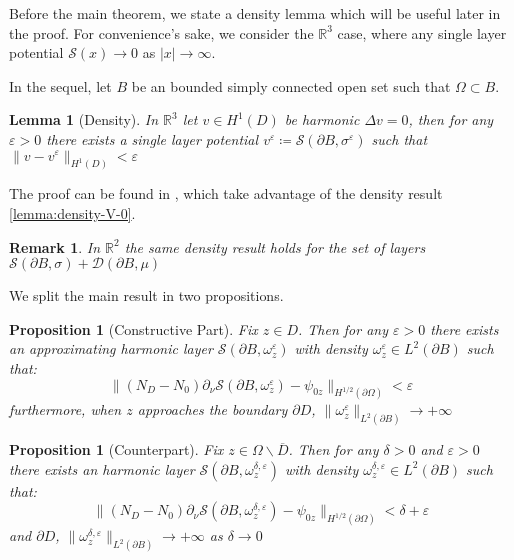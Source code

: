 \documentclass[10pt, a4paper, twoside, openright]{book}
\theoremstyle{definition}
\theoremstyle{plain}
\theoremstyle{plain}
\theoremstyle{plain}
\newtheorem{proposition}[subsection]{Proposition}
\theoremstyle{plain}
\newtheorem{remark}[subsection]{Remark}
\theoremstyle{plain}
\newtheorem{lemma}[subsection]{Lemma}
\theoremstyle{plain}
\theoremstyle{plain}
\theoremstyle{plain}
\let\epsilon\varepsilon
\begin{document}
 Before the main theorem, we state a density lemma which will be useful later in the proof. For convenience's sake, we consider the $\mathbb{R}^3$ case, 
 where any single layer potential $\mathcal{S}(x)\to0$ as $|x|\to \infty$.
 \par
 In the sequel, let $B$ be an bounded simply connected open set such that $\Omega\subset B$.
\begin{lemma}[Density]
 \label{lemma:lsm-density}
 In $\mathbb{R}^3$ let $v\in H^1(D)$ be harmonic $\Delta v=0$, then for any $\epsilon>0$ there exists 
 a single layer potential $v^\epsilon\coloneqq\mathcal{S}(\partial B, \sigma^\epsilon)$ such that $\|v-v^\epsilon\|_{H^1(D)}<\epsilon$
\end{lemma}
The proof can be found in \cite{somersalo:preprint}, which take advantage of the density result \ref{lemma:density-V-0}.
\begin{remark}
 In $\mathbb{R}^2$ the same density result holds for the set of layers $\mathcal{S}(\partial B, \sigma)+ \mathcal{D}(\partial B,\mu)$ 
\end{remark}
We split the main result in two propositions.
\begin{proposition}[Constructive Part]
\label{prop:lsm-constructive}
Fix $z \in D$. Then for any $\epsilon > 0$ there exists an approximating harmonic layer $\mathcal{S}(\partial B, \omega^\epsilon_z)$ with density $\omega^\epsilon_z\in L^2(\partial B)$  such that:
\begin{equation}
 \|({N_D} - {N_0})\partial_\nu\mathcal{S}(\partial B, \omega^\epsilon_z) - \psi_{0z}\|_{H^{1/2}(\partial\Omega)} < \epsilon
\end{equation}
furthermore, when $z$ approaches the boundary $\partial D$, $\|\omega^\epsilon_z\|_{L^2(\partial B)}\to + \infty$
\end{proposition}
\begin{proposition}[Counterpart]
\label{prop:lsm-counterpart}
Fix $z \in \Omega\backslash\overline{D}$. Then for any $\delta>0$ and $\epsilon > 0$ there exists an harmonic layer $\mathcal{S}(\partial B, \omega^{\delta, \epsilon}_z)$ with density $\omega^{\delta, \epsilon}_z\in L^2(\partial B)$ such that:
\begin{equation}
 \|({N_D} - {N_0})\partial_\nu\mathcal{S}(\partial B, \omega^{\delta,\epsilon}_z) - \psi_{0z}\|_{H^{1/2}(\partial\Omega)} < \delta + \epsilon
\end{equation}
and $\partial D$, $\|\omega^{\delta, \epsilon}_z\|_{L^2(\partial B)}\to + \infty$ as $\delta\to 0$
\end{proposition}
\end{document}
